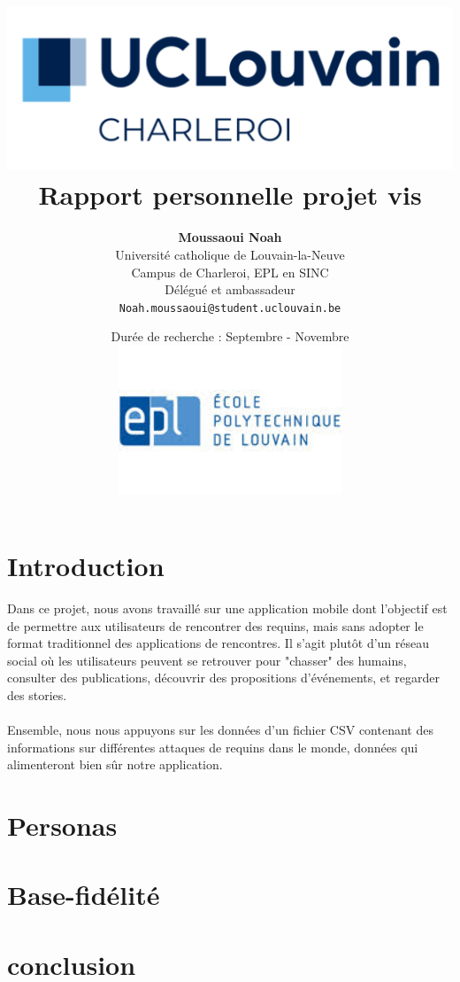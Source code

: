 \documentclass{article}
\title{
    \includegraphics[width=1\textwidth]{photo/UCLouvain_Charleroi.png} \\
    \vspace{1.5cm}
    {\Huge \textbf{Rapport personnelle projet vis}} \\
    \vspace{1.5cm}
}
\author{
    \textbf{Moussaoui Noah} \\
    Université catholique de Louvain-la-Neuve \\
    Campus de Charleroi, EPL en SINC \\
    Délégué et ambassadeur \\
    \texttt{Noah.moussaoui@student.uclouvain.be}
}
\date{
    \vspace{1.5cm}
    Durée de recherche : Septembre - Novembre \\
     \vspace{1.5cm}
    \includegraphics[width=0.5\textwidth]{photo/EPL.jpeg}
}
\begin{document}
\maketitle
\newpage
\section{Introduction}
Dans ce projet, nous avons travaillé sur une application mobile dont l'objectif est de permettre 
aux utilisateurs de rencontrer des requins, mais sans adopter le format traditionnel des applications
de rencontres. Il s'agit plutôt d'un réseau social où les utilisateurs peuvent se retrouver pour 
"chasser" des humains, consulter des publications, découvrir des propositions d’événements, 
et regarder des stories.\\\\

Ensemble, nous nous appuyons sur les données d’un fichier CSV contenant des informations 
sur différentes attaques de requins dans le monde, données qui alimenteront bien sûr notre application.


\section{Personas}


\section{Base-fidélité}


\section{conclusion}
\end{document}
